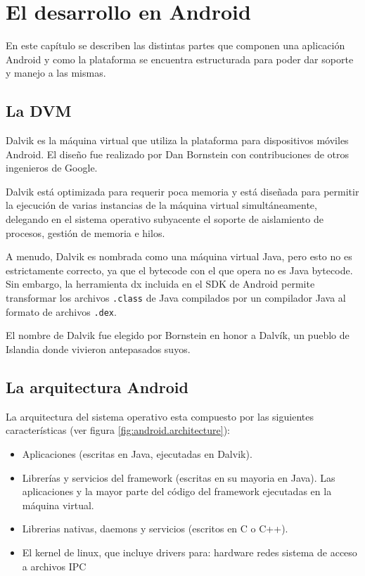 \chapter{El desarrollo en Android}
\label{cpt:android.dev}

En este cap\'itulo se describen las distintas partes que componen una aplicaci\'on Android y como la plataforma se encuentra estructurada para poder dar soporte y manejo a las mismas.

\section{La \ac{DVM}}
\label{sec:dvm}

Dalvik es la m\'aquina virtual que utiliza la plataforma para dispositivos m\'oviles Android. El dise\~no fue realizado por Dan Bornstein con contribuciones de otros ingenieros de Google.

Dalvik est\'a optimizada para requerir poca memoria y est\'a diseñada para permitir la ejecuci\'on de varias instancias de la m\'aquina virtual simult\'aneamente, delegando en el sistema operativo subyacente el soporte de aislamiento de procesos, gesti\'on de memoria e hilos.

A menudo, Dalvik es nombrada como una m\'aquina virtual Java, pero esto no es estrictamente correcto, ya que el bytecode con el que opera no es Java bytecode. Sin embargo, la herramienta dx incluida en el \ac{SDK} de Android permite transformar los archivos \texttt{.class} de Java compilados por un compilador Java al formato de archivos \texttt{.dex}.

El nombre de Dalvik fue elegido por Bornstein en honor a Dalvík, un pueblo de Islandia donde vivieron antepasados suyos.~\cite{wiki.dvm}

\section{La arquitectura Android}
\label{sec:arq}

La arquitectura del sistema operativo esta compuesto por las siguientes caracter\'isticas (ver figura \ref{fig:android.architecture}):


\begin{itemize}
\item Aplicaciones (escritas en Java, ejecutadas en Dalvik).
\item Librer\'ias y servicios del framework (escritas en su mayoria en Java).
\subitem Las aplicaciones y la mayor parte del c\'odigo del framework ejecutadas en la m\'aquina virtual. 
\item Librerias nativas, daemons y servicios (escritos en C o C++).
\item El kernel de linux, que incluye drivers para:
\subitem hardware
\subitem redes
\subitem sistema de acceso a archivos
\subitem \ac{IPC}
\end{itemize}

